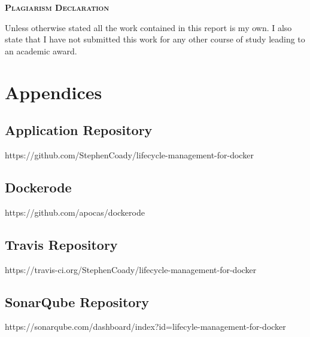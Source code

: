\documentclass{article}
\begin{document}
\onehalfspacing
\hypersetup{pageanchor=false}

\hypersetup{pageanchor=true}
\clearpage
\begin{center}
\begin{minipage}{\textwidth}
  
  {\scshape\large \textbf{Plagiarism Declaration}\par}
  \vspace{1cm}
  Unless otherwise stated all the work contained in this report is my own.  I also state that I have not submitted this work for any other course of study leading to an academic award.
\end{minipage}
\end{center}
\vfill %
\clearpage

\tableofcontents

\newpage
\printglossaries

\newpage


\newpage


\newpage


\newpage


\newpage
\appendix
\section*{Appendices}
\renewcommand{\thesubsection}{\Alph{subsection}}

\subsection{Application Repository}
\label{appendix:code}
https://github.com/StephenCoady/lifecycle-management-for-docker

\subsection{Dockerode} 
\label{appendix:dockerode_appendix}
https://github.com/apocas/dockerode

\subsection{Travis Repository} 
\label{appendix:travis}
https://travis-ci.org/StephenCoady/lifecycle-management-for-docker

\subsection{SonarQube Repository} 
\label{appendix:sonarqube}
https://sonarqube.com/dashboard/index?id=lifecyle-management-for-docker
\end{document}
